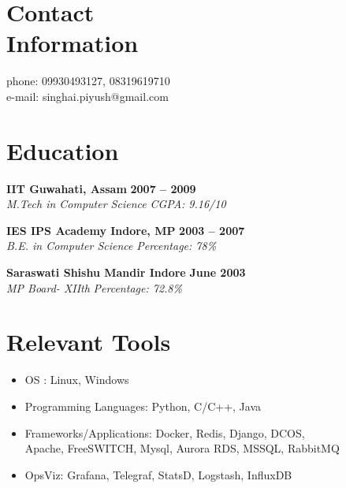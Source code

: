 \documentclass[margin,line]{resume}
\begin{document}
\begin{resume}

    \section{\mysidestyle Contact\\Information}

       				                      \hfill phone: 09930493127, 08319619710      \vspace{0mm}\\\vspace{0mm}%
        					      \hfill e-mail: singhai.piyush@gmail.com  \vspace{0mm}\vspace{-4.5mm}%

    \section{\mysidestyle Education}

    \textbf{IIT Guwahati, Assam} \hfill \textbf{2007 -- 2009}\vspace{0mm}\\\vspace{0mm}%
    \textsl{M.Tech in Computer Science} \hfill \textsl{CGPA: 9.16/10}

    \textbf{IES IPS Academy Indore, MP} \hfill \textbf{2003 -- 2007}\vspace{0mm}\\\vspace{0mm}%
    \textsl{B.E. in Computer Science} \hfill \textsl{Percentage: 78\%}

    \textbf{Saraswati Shishu Mandir Indore} \hfill \textbf{June 2003}\vspace{0mm}\\\vspace{0mm}%
    \textsl{MP Board- XIIth} \hfill \textsl{Percentage: 72.8\%}

    \section{\mysidestyle Relevant Tools}
     \begin{itemize}
      \item OS : Linux, Windows
      \item Programming Languages: Python, C/C++, Java
      \item Frameworks/Applications: Docker, Redis, Django, DCOS, \\
            Apache, FreeSWITCH, Mysql, Aurora RDS, MSSQL, RabbitMQ
      \item OpsViz: Grafana, Telegraf, StatsD, Logstash, InfluxDB
     \end{itemize}


\end{resume}
\end{document}
